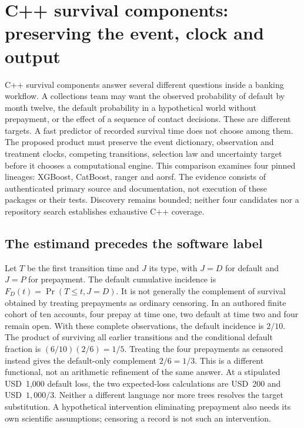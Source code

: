 \section{C++ survival components: preserving the event, clock and output}
\label{sec:exec24-longitudinal-cxx}

C++ survival components answer several different questions inside a banking
workflow. A collections team may want the observed probability of default by
month twelve, the default probability in a hypothetical world without prepayment,
or the effect of a sequence of contact decisions. These are different targets.
A fast predictor of recorded survival time does not choose among them. The
proposed product must preserve the event dictionary, observation and treatment
clocks, competing transitions, selection law and uncertainty target before it
chooses a computational engine. This comparison examines four pinned lineages:
XGBoost, CatBoost, ranger and aorsf. The evidence consists of authenticated primary
source and documentation, not execution of these packages or their tests.
Discovery remains bounded; neither four candidates nor a repository search
establishes exhaustive C++ coverage.~\citep{exec24_longcxx_xgboost,exec24_longcxx_catboost,exec24_longcxx_ranger,exec24_longcxx_aorsf}

\subsection{The estimand precedes the software label}

Let $T$ be the first transition time and $J$ its type, with $J=D$ for default
and $J=P$ for prepayment. The default cumulative incidence is
$F_D(t)=\Pr(T\leq t,J=D)$. It is not generally the complement of survival
obtained by treating prepayments as ordinary censoring. In an authored finite
cohort of ten accounts, four prepay at time one, two default at time two and
four remain open. With these complete observations, the default incidence is
$2/10$. The product of surviving all earlier transitions and the conditional
default fraction is $(6/10)(2/6)=1/5$. Treating the four prepayments as censored
instead gives the default-only complement $2/6=1/3$. This is a different
functional, not an arithmetic refinement of the same answer. At a stipulated
USD~1,000 default loss, the two expected-loss calculations are USD~200 and
USD~$1{,}000/3$. Neither a different language nor more trees resolves the
target substitution. A hypothetical intervention eliminating prepayment also
needs its own scientific assumptions; censoring a record is not such an
intervention.~\citep{exec24_longcxx_reference}

